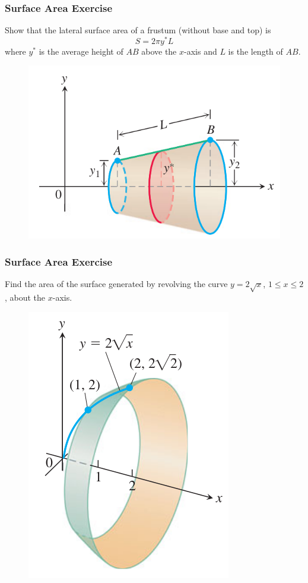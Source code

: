\documentclass[xcolor=dvipsnames]{beamer}
\begin{document}
\begin{frame}
  \frametitle{Surface Area Exercise}
{\ubung}  Show that the lateral surface area of a frustum (without base and top) is
\begin{equation}
  \label{eq:eequochi}
  S=2\pi{}y^{\ast}L
\end{equation}
where $y^{\ast}$ is the average height of $AB$ above the $x$-axis and
$L$ is the length of $AB$.
\begin{figure}[h]
  \includegraphics[scale=0.3]{./diagrams/frustumarea.png}
\end{figure}
\end{frame}

\begin{frame}
  \frametitle{Surface Area Exercise}
{\ubung} Find the area of the surface generated by revolving the curve
$y=2\sqrt{x}$, $1\leq{}x\leq{}2$, about the $x$-axis.
\begin{figure}[h]
  \includegraphics[scale=0.3]{./diagrams/revosurf1.png}
\end{figure}
\addtocounter{exercise}{-1}
\end{frame}
\end{document}
